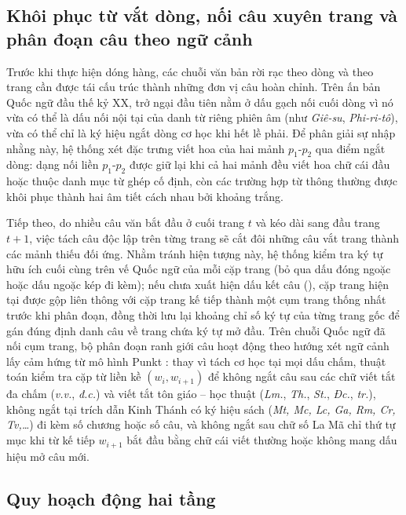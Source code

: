 \subsection{Khôi phục từ vắt dòng, nối câu xuyên trang và phân đoạn câu theo ngữ cảnh}

Trước khi thực hiện dóng hàng, các chuỗi văn bản rời rạc theo dòng và theo trang cần được tái cấu trúc thành những đơn vị câu hoàn chỉnh. Trên ấn bản Quốc ngữ đầu thế kỷ XX, trở ngại đầu tiên nằm ở dấu gạch nối cuối dòng vì nó vừa có thể là dấu nối nội tại của danh từ riêng phiên âm (như \textit{Giê-su}, \textit{Phi-ri-tô}), vừa có thể chỉ là ký hiệu ngắt dòng cơ học khi hết lề phải. Để phân giải sự nhập nhằng này, hệ thống xét đặc trưng viết hoa của hai mảnh $p_1\text{-}p_2$ qua điểm ngắt dòng: dạng nối liền $p_1\text{-}p_2$ được giữ lại khi cả hai mảnh đều viết hoa chữ cái đầu hoặc thuộc danh mục từ ghép cố định, còn các trường hợp từ thông thường được khôi phục thành hai âm tiết cách nhau bởi khoảng trắng.

Tiếp theo, do nhiều câu văn bắt đầu ở cuối trang $t$ và kéo dài sang đầu trang $t+1$, việc tách câu độc lập trên từng trang sẽ cắt đôi những câu vắt trang thành các mảnh thiếu đối ứng. Nhằm tránh hiện tượng này, hệ thống kiểm tra ký tự hữu ích cuối cùng trên vế Quốc ngữ của mỗi cặp trang (bỏ qua dấu đóng ngoặc hoặc dấu ngoặc kép đi kèm); nếu chưa xuất hiện dấu kết câu (), cặp trang hiện tại được gộp liên thông với cặp trang kế tiếp thành một cụm trang thống nhất trước khi phân đoạn, đồng thời lưu lại khoảng chỉ số ký tự của từng trang gốc để gán đúng định danh câu về trang chứa ký tự mở đầu. Trên chuỗi Quốc ngữ đã nối cụm trang, bộ phân đoạn ranh giới câu hoạt động theo hướng xét ngữ cảnh lấy cảm hứng từ mô hình Punkt \cite{kiss2006punkt}: thay vì tách cơ học tại mọi dấu chấm, thuật toán kiểm tra cặp từ liền kề $(w_i, w_{i+1})$ để không ngắt câu sau các chữ viết tắt đa chấm (\textit{v.v.}, \textit{đ.c.}) và viết tắt tôn giáo -- học thuật (\textit{Lm.}, \textit{Th.}, \textit{St.}, \textit{Đc.}, \textit{tr.}), không ngắt tại trích dẫn Kinh Thánh có ký hiệu sách (\textit{Mt, Mc, Lc, Ga, Rm, Cr, Tv,\ldots}) đi kèm số chương hoặc số câu, và không ngắt sau chữ số La Mã chỉ thứ tự mục khi từ kế tiếp $w_{i+1}$ bắt đầu bằng chữ cái viết thường hoặc không mang dấu hiệu mở câu mới.

\subsection{Quy hoạch động hai tầng}

